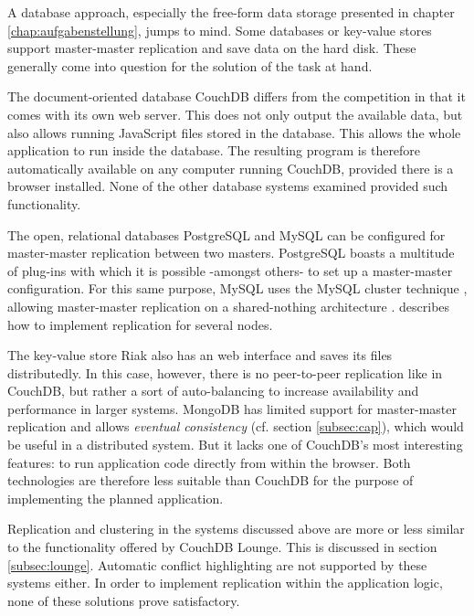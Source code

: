 A database approach, especially the free-form data storage presented in chapter \ref{chap:aufgabenstellung}, jumps to mind. Some databases or key-value stores support master-master replication and save data on the hard disk. These generally come into question for the solution of the task at hand.

The document-oriented database CouchDB differs from the competition in that it comes with its own web server. This does not only output the available data, but also allows running JavaScript files stored in the database. This allows the whole application to run inside the database. The resulting program is therefore automatically available on any computer running CouchDB, provided there is a browser installed. None of the other database systems examined provided such functionality.

The open, relational databases PostgreSQL \cite{postgres:website} and MySQL \cite{mysql:website} can be configured for master-master replication between two masters. PostgreSQL boasts a multitude of plug-ins \cite{postgres:replication} with which it is possible -amongst others- to set up a master-master configuration. For this same purpose, MySQL uses the MySQL cluster technique \cite{mysql:cluster}, allowing master-master replication on a shared-nothing architecture . \cite{mysql:multimaster} describes how to implement replication for several nodes.

The key-value store Riak \cite{riak:website} also has an web interface and saves its files distributedly. In this case, however, there is no peer-to-peer replication like in CouchDB, but rather a sort of auto-balancing to increase availability and performance in larger systems. MongoDB \cite{mongodb:website} has limited support for master-master replication and allows \textit{eventual consistency} (cf. section \ref{subsec:cap}), which would be useful in a distributed system. But it lacks one of CouchDB's most interesting features: to run application code directly from within the browser. Both technologies are therefore less suitable than CouchDB for the purpose of implementing the planned application.

Replication and clustering in the systems discussed above are more or less similar to the functionality offered by CouchDB Lounge. This is discussed in section \ref{subsec:lounge}. Automatic conflict highlighting are not supported by these systems either. In order to implement replication within the application logic, none of these solutions prove satisfactory.

